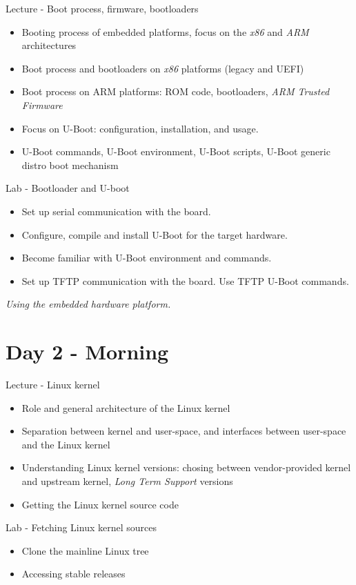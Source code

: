 \documentclass[a4paper,12pt,obeyspaces,spaces,hyphens]{article}
\begin{document}
\feagendatwocolumn
{Lecture - Boot process, firmware, bootloaders}
{
  \begin{itemize}
  \item Booting process of embedded platforms, focus on the {\em x86}
    and {\em ARM} architectures
  \item Boot process and bootloaders on {\em x86} platforms (legacy
    and UEFI)
  \item Boot process on ARM platforms: ROM code, bootloaders, {\em ARM
      Trusted Firmware}
  \item Focus on U-Boot: configuration, installation, and usage.
  \item U-Boot commands, U-Boot environment, U-Boot scripts, U-Boot
    generic distro boot mechanism
  \end{itemize}
}
{Lab - Bootloader and U-boot}
{
  \begin{itemize}
  \item Set up serial communication with the board.
  \item Configure, compile and install U-Boot for the target hardware.
  \item Become familiar with U-Boot environment and commands.
  \item Set up TFTP communication with the board. Use TFTP U-Boot
    commands.
  \end{itemize}

  \vspace{0.5cm}
  {\em Using the embedded hardware platform.}
}

\section{Day 2 - Morning}

\feagendatwocolumn
{Lecture - Linux kernel}
{
  \begin{itemize}
  \item Role and general architecture of the Linux kernel
  \item Separation between kernel and user-space, and interfaces
    between user-space and the Linux kernel
  \item Understanding Linux kernel versions: chosing between
    vendor-provided kernel and upstream kernel, {\em Long Term
      Support} versions
  \item Getting the Linux kernel source code
  \end{itemize}
}
{Lab - Fetching Linux kernel sources}
{
  \begin{itemize}
  \item Clone the mainline Linux tree
  \item Accessing stable releases
  \end{itemize}
}
\end{document}

